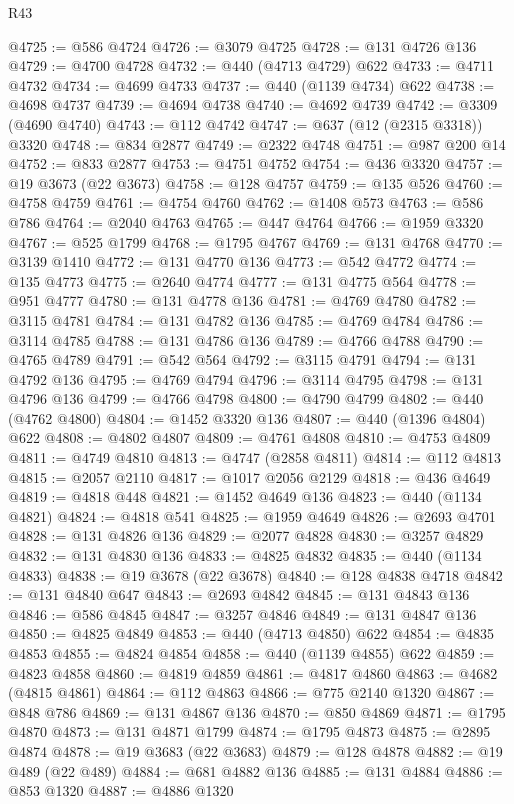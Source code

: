 \begin{lexlean}{R43}
\begin{coremodule}
@4725 := @586 @4724
@4726 := @3079 @4725
@4728 := @131 @4726 @136
@4729 := @4700 @4728
@4732 := @440 (@4713 @4729) @622
@4733 := @4711 @4732
@4734 := @4699 @4733
@4737 := @440 (@1139 @4734) @622
@4738 := @4698 @4737
@4739 := @4694 @4738
@4740 := @4692 @4739
@4742 := @3309 (@4690 @4740)
@4743 := @112 @4742
@4747 := @637 (@12 (@2315 @3318)) @3320
@4748 := @834 @2877
@4749 := @2322 @4748
@4751 := @987 @200 @14
@4752 := @833 @2877
@4753 := @4751 @4752
@4754 := @436 @3320
@4757 := @19 @3673 (@22 @3673)
@4758 := @128 @4757
@4759 := @135 @526
@4760 := @4758 @4759
@4761 := @4754 @4760
@4762 := @1408 @573
@4763 := @586 @786
@4764 := @2040 @4763
@4765 := @447 @4764
@4766 := @1959 @3320
@4767 := @525 @1799
@4768 := @1795 @4767
@4769 := @131 @4768
@4770 := @3139 @1410
@4772 := @131 @4770 @136
@4773 := @542 @4772
@4774 := @135 @4773
@4775 := @2640 @4774
@4777 := @131 @4775 @564
@4778 := @951 @4777
@4780 := @131 @4778 @136
@4781 := @4769 @4780
@4782 := @3115 @4781
@4784 := @131 @4782 @136
@4785 := @4769 @4784
@4786 := @3114 @4785
@4788 := @131 @4786 @136
@4789 := @4766 @4788
@4790 := @4765 @4789
@4791 := @542 @564
@4792 := @3115 @4791
@4794 := @131 @4792 @136
@4795 := @4769 @4794
@4796 := @3114 @4795
@4798 := @131 @4796 @136
@4799 := @4766 @4798
@4800 := @4790 @4799
@4802 := @440 (@4762 @4800)
@4804 := @1452 @3320 @136
@4807 := @440 (@1396 @4804) @622
@4808 := @4802 @4807
@4809 := @4761 @4808
@4810 := @4753 @4809
@4811 := @4749 @4810
@4813 := @4747 (@2858 @4811)
@4814 := @112 @4813
@4815 := @2057 @2110
@4817 := @1017 @2056 @2129
@4818 := @436 @4649
@4819 := @4818 @448
@4821 := @1452 @4649 @136
@4823 := @440 (@1134 @4821)
@4824 := @4818 @541
@4825 := @1959 @4649
@4826 := @2693 @4701
@4828 := @131 @4826 @136
@4829 := @2077 @4828
@4830 := @3257 @4829
@4832 := @131 @4830 @136
@4833 := @4825 @4832
@4835 := @440 (@1134 @4833)
@4838 := @19 @3678 (@22 @3678)
@4840 := @128 @4838 @4718
@4842 := @131 @4840 @647
@4843 := @2693 @4842
@4845 := @131 @4843 @136
@4846 := @586 @4845
@4847 := @3257 @4846
@4849 := @131 @4847 @136
@4850 := @4825 @4849
@4853 := @440 (@4713 @4850) @622
@4854 := @4835 @4853
@4855 := @4824 @4854
@4858 := @440 (@1139 @4855) @622
@4859 := @4823 @4858
@4860 := @4819 @4859
@4861 := @4817 @4860
@4863 := @4682 (@4815 @4861)
@4864 := @112 @4863
@4866 := @775 @2140 @1320
@4867 := @848 @786
@4869 := @131 @4867 @136
@4870 := @850 @4869
@4871 := @1795 @4870
@4873 := @131 @4871 @1799
@4874 := @1795 @4873
@4875 := @2895 @4874
@4878 := @19 @3683 (@22 @3683)
@4879 := @128 @4878
@4882 := @19 @489 (@22 @489)
@4884 := @681 @4882 @136
@4885 := @131 @4884
@4886 := @853 @1320
@4887 := @4886 @1320

\end{coremodule}
\end{lexlean}
